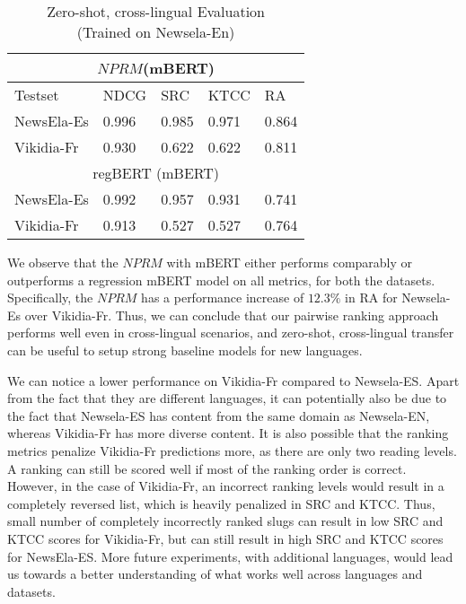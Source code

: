 \documentclass[11pt]{article}
\begin{document}
\begin{table}[htb]
\begin{tabular}{ |p{2.45cm}|p{0.85cm}|p{0.7cm}|p{0.8cm}| p{0.7cm}|}
 \hline 
 \multicolumn{5}{|c|}{$NPRM$(mBERT)} \\ \hline
 Testset & NDCG & SRC &KTCC & RA\\
 \hline
 NewsEla-Es& 0.996 & 0.985 & 0.971 & 0.864\\ 
 \hline
 Vikidia-Fr& 0.930 & 0.622 & 0.622 & 0.811\\
 \hline
  \multicolumn{5}{|c|}{regBERT (mBERT)} \\ \hline
  NewsEla-Es & 0.992 & 0.957 & 0.931 & 0.741\\
 \hline
 Vikidia-Fr& 0.913 & 0.527 & 0.527 & 0.764\\
 \hline
\end{tabular}
\caption{Zero-shot, cross-lingual Evaluation \\ (Trained on Newsela-En)}
\label{tab:rankingcrossling}
\end{table}


We observe that the $NPRM$ with mBERT either performs comparably or outperforms a regression mBERT model on all metrics, for both the datasets. Specifically, the $NPRM$ has a performance increase of $12.3\%$ in RA for Newsela-Es over Vikidia-Fr. Thus, we can conclude that our pairwise ranking approach performs well even in cross-lingual scenarios, and zero-shot, cross-lingual transfer can be useful to setup strong baseline models for new languages. 

We can notice a lower performance on Vikidia-Fr compared to Newsela-ES. Apart from the fact that they are different languages, it can potentially also be due to the fact that Newsela-ES has content from the same domain as Newsela-EN, whereas Vikidia-Fr has more diverse content.  It is also possible that the ranking metrics penalize Vikidia-Fr predictions more, as there are only two reading levels. A ranking can still be scored well if most of the ranking order is correct. However, in the case of Vikidia-Fr, an incorrect ranking levels would result in a completely reversed list, which is heavily penalized in SRC and KTCC.  Thus, small number of completely incorrectly ranked slugs can result in low SRC and KTCC scores for Vikidia-Fr, but can still result in high SRC and KTCC scores for NewsEla-ES. More future experiments, with additional languages, would lead us towards a better understanding of what works well across languages and datasets. 
\end{document}
